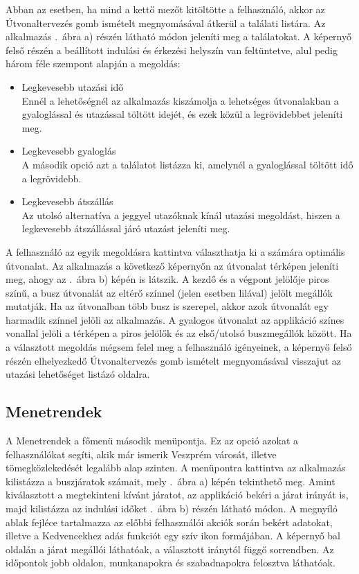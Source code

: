 Abban az esetben, ha mind a kettő mezőt kitöltötte a felhasználó, akkor az Útvonaltervezés gomb ismételt megnyomásával átkerül a találati listára.
Az alkalmazás .\ ábra a) részén látható módon jeleníti meg a találatokat.
A képernyő felső részén a beállított indulási és érkezési helyszín van feltüntetve, alul pedig három féle szempont alapján a megoldás:
\begin{itemize}
	\item Legkevesebb utazási idő
	\\Ennél a lehetőségnél az alkalmazás kiszámolja a lehetséges útvonalakban a gyaloglással és utazással töltött idejét, és ezek közül a legrövidebbet jeleníti meg.
	\item Legkevesebb gyaloglás
	\\A második opció azt a találatot listázza ki, amelynél a gyaloglással töltött idő a legrövidebb.
	\item Legkevesebb átszállás
	\\Az utolsó alternatíva a jeggyel utazóknak kínál utazási megoldást, hiszen a legkevesebb átszállással járó utazást jeleníti meg.
\end{itemize}
A felhasználó az egyik megoldásra kattintva választhatja ki a számára optimális útvonalat.
Az alkalmazás a következő képernyőn az útvonalat térképen jeleníti meg, ahogy az .\ ábra b) képén is látszik.
A kezdő és a végpont jelölője piros színű, a busz útvonalát az eltérő színnel (jelen esetben lilával) jelölt megállók mutatják.
Ha az útvonalban több busz is szerepel, akkor azok útvonalát egy harmadik színnel jelöli az alkalmazás.
A gyalogos útvonalat az applikáció színes vonallal jelöli a térképen a piros jelölők és az első/utolsó buszmegállók között.
Ha a választott megoldás mégsem felel meg a felhasználó igényeinek, a képernyő felső részén elhelyezkedő Útvonaltervezés gomb ismételt megnyomásával visszajut az utazási lehetőséget listázó oldalra.
\subsection {Menetrendek}
\label {menetrendek}
A Menetrendek a főmenü második menüpontja.
Ez az opció azokat a felhasználókat segíti, akik már ismerik Veszprém városát, illetve tömegközlekedését legalább alap szinten.
A menüpontra kattintva az alkalmazás kilistázza a buszjáratok számait, mely .\ ábra  a) képén tekinthető meg.
Amint kiválasztott a megtekinteni kívánt járatot, az applikáció bekéri a járat irányát is, majd kilistázza az indulási időket .\ ábra b) részén látható módon.
A megnyíló ablak fejléce tartalmazza az előbbi felhasználói akciók során bekért adatokat, illetve a Kedvencekhez adás funkciót egy szív ikon formájában.
A képernyő bal oldalán a járat megállói láthatóak, a választott iránytól függő sorrendben.
Az időpontok jobb oldalon, munkanapokra és szabadnapokra felosztva láthatóak.


